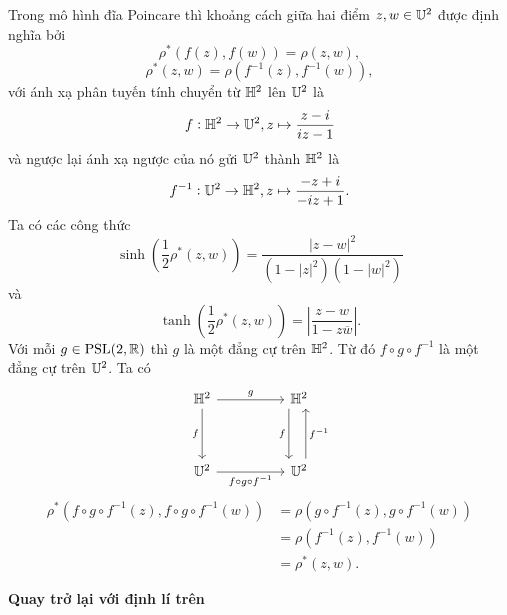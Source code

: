     \begin{remark*}    
    Trong mô hình đĩa Poincare thì khoảng cách giữa hai điểm $z,w \in \mathbb{U}^2$ được định nghĩa bởi 
    \[\rho^*(f(z),f(w)) = \rho(z,w),\]
    \[\rho^*(z,w) = \rho(f^{-1}(z),f^{-1}(w)), \]
    với ánh xạ phân tuyến tính chuyển từ $\mathbb{H}^2$ lên $\mathbb{U}^2$ là
    \[f: \mathbb{H}^2 \to \mathbb{U}^2, z\mapsto \dfrac{z-i}{iz-1}\]
    và ngược lại ánh xạ ngược của nó gửi $\mathbb{U}^2$ thành $\mathbb{H}^2$ là
    \[f^{-1}:\mathbb{U}^2 \to \mathbb{H}^2, z\mapsto \dfrac{-z+i}{-iz+1}.\]
    Ta có các công thức \[\sinh\left(\dfrac{1}{2}\rho^*(z,w)\right) = \dfrac{|z-w|^2}{(1-|z|^2)(1-|w|^2)}\] và \[\tanh{\left(\dfrac{1}{2}\rho^*(z,w)\right)} = \left|\dfrac{z-w}{1-z\overline{w}}\right|.\]
    Với mỗi $g \in \operatorname{PSL}(2,\mathbb{R})$ thì $g$ là một đẳng cự trên $\mathbb{H}^2$. Từ đó $f \circ g \circ f^{-1}$ là một đẳng cự trên $\mathbb{U}^2$. Ta có
    \[\begin{tikzcd}
    	\hh && \hh \\
    	\\
    	\U && \U
    	\arrow["g", from=1-1, to=1-3]
    	\arrow["f"', from=1-1, to=3-1]
    	\arrow["{f\circ g \circ f^{-1}}"', from=3-1, to=3-3]
    	\arrow["f"', shift right=3, from=1-3, to=3-3]
    	\arrow["{f^{-1}}"', shift right=2, from=3-3, to=1-3]
    \end{tikzcd}\]
    \begin{align*}
        \rho^*(f \circ g \circ f^{-1}(z),f \circ g \circ f^{-1}(w))
        &= \rho(g \circ f^{-1}(z), g \circ f^{-1}(w))\\
        &= \rho(f^{-1}(z), f^{-1}(w))\\
        &= \rho^*(z,w).
    \end{align*}
\end{remark*}
\textbf{Quay trở lại với định lí trên}
